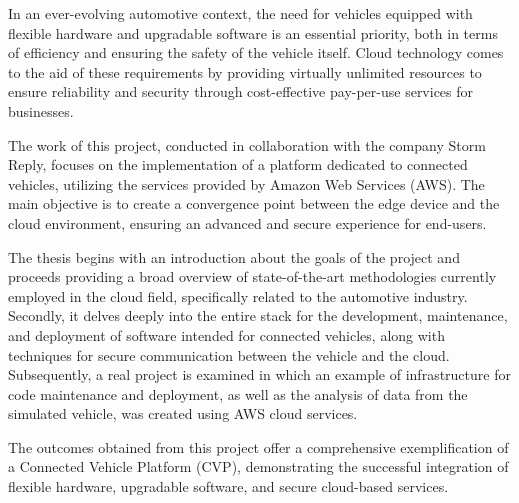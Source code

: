 \sommario

In an ever-evolving automotive context, the need for vehicles equipped with flexible hardware and upgradable software is an essential priority, both in terms of efficiency and ensuring the safety of the vehicle itself. 
Cloud technology comes to the aid of these requirements by providing virtually unlimited resources to ensure reliability and security through cost-effective pay-per-use services for businesses. 

The work of this project, conducted in collaboration with the company Storm Reply, focuses on the implementation of a platform dedicated to connected vehicles, utilizing the services provided by Amazon Web Services (AWS). 
The main objective is to create a convergence point between the edge device and the cloud environment, ensuring an advanced and secure experience for end-users. 

The thesis begins with an introduction about the goals of the project and proceeds providing a broad overview of state-of-the-art methodologies currently employed in the cloud field, specifically related to the automotive industry.\\
Secondly, it delves deeply into the entire stack for the development, maintenance, and deployment of software intended for connected vehicles, along with techniques for secure communication between the vehicle and the cloud.\\
Subsequently, a real project is examined in which an example of infrastructure for code maintenance and deployment, as well as the analysis of data from the simulated vehicle, was created using AWS cloud services.

The outcomes obtained from this project offer a comprehensive exemplification of a Connected Vehicle Platform (CVP), demonstrating the successful integration of flexible hardware, upgradable software, and secure cloud-based services.